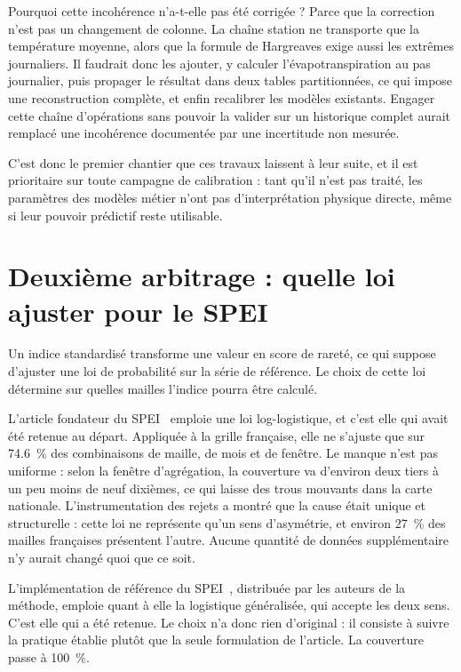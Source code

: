 Pourquoi cette incohérence n'a-t-elle pas été corrigée ? Parce que la correction n'est pas un
changement de colonne. La chaîne station ne transporte que la température moyenne, alors que la
formule de Hargreaves exige aussi les extrêmes journaliers. Il faudrait donc les ajouter, y
calculer l'évapotranspiration au pas journalier, puis propager le résultat dans deux tables
partitionnées, ce qui impose une reconstruction complète, et enfin recalibrer les modèles
existants. Engager cette chaîne d'opérations sans pouvoir la valider sur un historique complet
aurait remplacé une incohérence documentée par une incertitude non mesurée.

C'est donc le premier chantier que ces travaux laissent à leur suite, et il est prioritaire sur
toute campagne de calibration : tant qu'il n'est pas traité, les paramètres des modèles métier
n'ont pas d'interprétation physique directe, même si leur pouvoir prédictif reste utilisable.

\section{Deuxième arbitrage : quelle loi ajuster pour le SPEI}
\label{sec:glo}

Un indice standardisé transforme une valeur en score de rareté, ce qui suppose d'ajuster une loi
de probabilité sur la série de référence. Le choix de cette loi détermine sur quelles mailles
l'indice pourra être calculé.

L'article fondateur du SPEI~\cite{vicenteserrano2010spei} emploie une loi log-logistique, et
c'est elle qui avait été retenue au départ. Appliquée à la grille française, elle ne s'ajuste que
sur \SI{74,6}{\percent} des combinaisons de maille, de mois et de fenêtre. Le manque n'est pas
uniforme : selon la fenêtre d'agrégation, la couverture va d'environ deux tiers à un peu moins de
neuf dixièmes, ce qui laisse des trous mouvants dans la carte nationale. L'instrumentation
des rejets a montré que la cause était unique et structurelle : cette loi ne représente qu'un
sens d'asymétrie, et environ \SI{27}{\percent} des mailles françaises présentent l'autre. Aucune
quantité de données supplémentaire n'y aurait changé quoi que ce soit.

L'implémentation de référence du SPEI~\cite{begueria_spei_package}, distribuée par les auteurs de
la méthode, emploie quant à elle la logistique généralisée, qui accepte les deux sens. C'est
elle qui a été retenue. Le choix n'a donc rien d'original : il consiste à suivre la pratique
établie plutôt que la seule formulation de l'article. La couverture passe à \SI{100}{\percent}.

